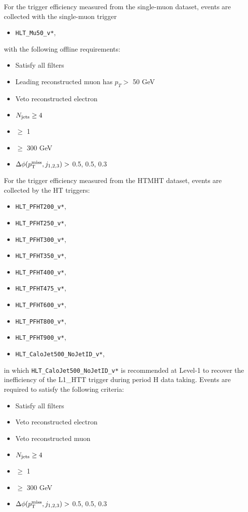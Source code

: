For the \MET trigger efficiency measured from the single-muon dataset, events are collected with the single-muon trigger
\begin{itemize}
  \item \texttt{HLT\_Mu50\_v*},
\end{itemize}
with the following offline requirements:
\begin{itemize}
  \item Satisfy all filters
	\item Leading reconstructed muon has $p_{T}>$ 50 GeV
  \item Veto reconstructed electron
  \item $N_{\text{jets}}\geq4$
  \item \nbjets $\ge$ 1
  \item \HT $\ge$ 300 GeV
  \item $\Delta\phi(p^{\rm miss}_{\rm T}, j_{1,2,3})>$ 0.5, 0.5, 0.3
\end{itemize}
For the \MET trigger efficiency measured from the HTMHT dataset, events are collected by the HT triggers: 
\begin{itemize}
  \item \texttt{HLT\_PFHT200\_v*},
  \item \texttt{HLT\_PFHT250\_v*},
  \item \texttt{HLT\_PFHT300\_v*},
  \item \texttt{HLT\_PFHT350\_v*},
  \item \texttt{HLT\_PFHT400\_v*},
  \item \texttt{HLT\_PFHT475\_v*},
  \item \texttt{HLT\_PFHT600\_v*},
  \item \texttt{HLT\_PFHT800\_v*},
  \item \texttt{HLT\_PFHT900\_v*},
  \item \texttt{HLT\_CaloJet500\_NoJetID\_v*},
\end{itemize} 
in which \texttt{HLT\_CaloJet500\_NoJetID\_v*} is recommended at Level-1 to recover the inefficiency of the L1\_HTT trigger during period H data taking. Events are required to satisfy the following criteria:
\begin{itemize}
  \item Satisfy all filters
  \item Veto reconstructed electron
  \item Veto reconstructed muon
  \item $N_{\text{jets}}\geq4$
  \item \nbjets $\ge$ 1
  \item \HT $\ge$ 300 GeV
  \item $\Delta\phi(p^{\rm miss}_{\rm T}, j_{1,2,3})>$ 0.5, 0.5, 0.3
\end{itemize}

